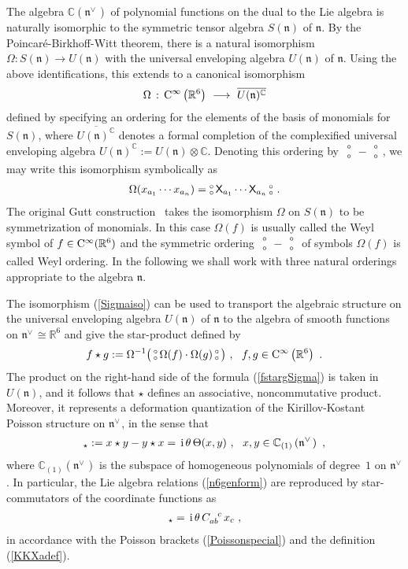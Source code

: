 \documentclass[11pt,a4paper]{article}
\newcommand{\NO}{\mbox{$\substack{\circ\\\circ}$}}      %
\newcommand{\1}{\mathbb{1}}
\def\ii{{\,{\rm i}\,}}
\def\CC{{\rm C}}
\def\X{{\sf X}}
\def\mfn{{\mathfrak n}}
\newcommand{\complex}{{\mathbb C}} %
\newcommand{\real}{{\mathbb R}} %
\newcommand{\beq}{\begin{eqnarray}}
\newcommand{\eeq}{\end{eqnarray}}
\begin{document}
The algebra $\complex(\mfn^{\vee\,})$ of polynomial functions on the dual
to the Lie algebra is naturally isomorphic to the symmetric tensor algebra
$S(\mfn)$ of $\mfn$. By the Poincar\'e-Birkhoff-Witt theorem,
there is a natural isomorphism $\Omega:S(\mfn)\to
U(\mfn)$ with the universal enveloping algebra $U(\mfn)$ of
$\mfn$. Using the above identifications, this extends to a canonical
isomorphism
\beq
\Omega\,:\,\CC^\infty\left(\real^6\right)~\longrightarrow~\overline{
U(\mfn)^\complex}
\label{Sigmaiso}\eeq
defined by specifying an ordering for the elements of the
basis of monomials for $S(\mfn)$, where
$\overline{U(\mfn)^\complex}$ denotes a formal completion of the
complexified universal enveloping algebra
$U(\mathfrak{n})^\complex:=U(\mathfrak{n})\otimes\complex$.
Denoting this ordering by $\NO-\NO$, we may write this
isomorphism symbolically as
\beq
\Omega(x_{a_1}\cdots x_{a_n})=\NO\,\X_{a_1}\cdots\X_{a_n}\,\NO \ .
\label{Sigmasymbol}\eeq
The original Gutt construction~\cite{Gutt1} takes the isomorphism
$\Omega$ on $S(\mfn)$ to be symmetrization of monomials. In this
case $\Omega(f)$ is usually called the Weyl symbol of
$f\in\CC^\infty(\real^6)$ and the symmetric ordering $\NO-\NO$
of symbols $\Omega(f)$ is called Weyl ordering. In the following we
shall work with three natural orderings appropriate to the
algebra $\mfn$.

The isomorphism (\ref{Sigmaiso}) can be used to transport the
algebraic structure on the universal enveloping algebra $U(\mfn)$ of
$\mfn$ to the algebra of smooth functions on $\mfn^{\vee\,}\cong\real^6$
and give the star-product defined by
\beq
f\star g:=\Omega^{-1}\bigl(\,\NO\,\Omega(f)\cdot\Omega(g)\,\NO
\,\bigr) \ , ~~ f,g\in\CC^\infty\left(\real^6\right) \ .
\label{fstargSigma}\eeq
The product on the right-hand side of the formula (\ref{fstargSigma})
is taken in $U(\mfn)$, and it follows that $\star$ defines an
associative, noncommutative product. Moreover, it represents a
deformation quantization of the Kirillov-Kostant Poisson structure on
$\mfn^{\vee\,}$, in the sense that
\beq
[x,y]_\star:=x\star y-y\star x=\ii
\theta\,\Theta(x,y) \ , ~~ x,y\in\complex_{(1)}\left(\mfn^{\vee\,}\right) \ ,
\label{xyPoisson}\eeq
where $\complex_{(1)}(\mfn^{\vee\,})$ is the subspace of homogeneous
polynomials of degree~$1$ on $\mfn^{\vee\,}$. In particular, the Lie
algebra relations (\ref{n6genform}) are reproduced by star-commutators
of the coordinate functions as
\beq
[x_a,x_b]_\star=\ii\theta\,C_{ab}^{~~c}\,x_c \ ,
\label{xaxbstarcomm}\eeq
in accordance with the Poisson brackets (\ref{Poissonspecial}) and the
definition (\ref{KKXadef}).
\end{document}
